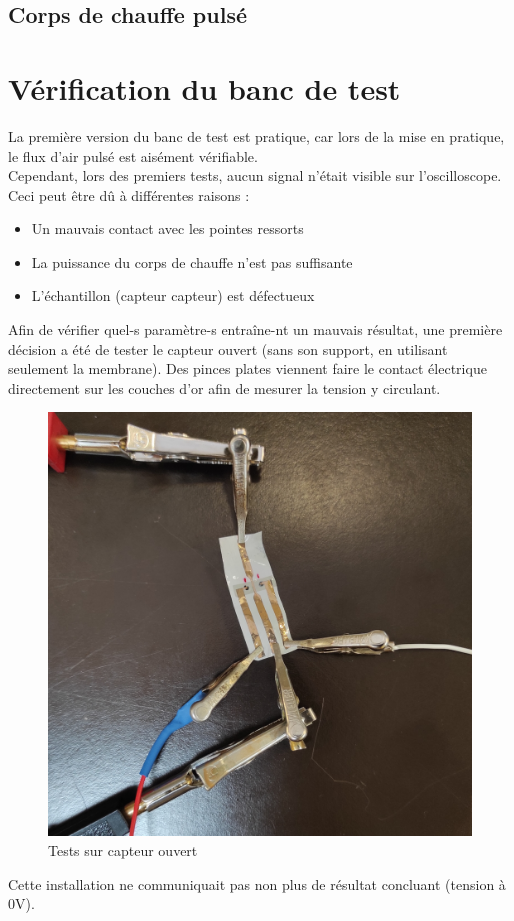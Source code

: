 \subsection{Corps de chauffe pulsé}

\section{Vérification du banc de test}
La première version du banc de test est pratique, car lors de la mise en pratique, le flux d'air pulsé est aisément vérifiable. \\
Cependant, lors des premiers tests, aucun signal n'était visible sur l'oscilloscope. Ceci peut être dû à différentes raisons :
\begin{itemize}
    \item Un mauvais contact avec les pointes ressorts
    \item La puissance du corps de chauffe n'est pas suffisante
    \item L'échantillon (capteur \gls{capteur}) est défectueux
\end{itemize}

Afin de vérifier quel-s paramètre-s entraîne-nt un mauvais résultat, une première décision a été de tester le \gls{capteur} ouvert (sans son support,
en utilisant seulement la membrane).
Des pinces plates viennent faire le contact électrique directement sur les couches d'or afin de mesurer la tension y circulant.
\begin{figure}[H]
    \centering
    \includegraphics[scale = 0.05]{assets/figures/CapteurOuvert.jpg}
    \caption{Tests sur capteur ouvert}
    \label{fig:capteurOuvert}
\end{figure}
Cette installation ne communiquait pas non plus de résultat concluant (tension à 0V). \\

